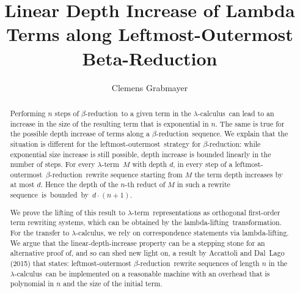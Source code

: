 \documentclass[
submission
]{dmtcs-episciences-tampered}
\author{Clemens Grabmayer\affiliationmark{1}}
\title{{Linear Depth Increase of Lambda Terms
        along Leftmost-Outermost Beta-Reduction}}
\affiliation{
Gran Sasso Science Institute, Viale F. Crispi, 7, 67100 L'Aquila AQ, Italy}
\newcommand{\nb}{\nobreakdash}
\newcommand{\alter}{M}
\newcommand{\lambdacalculus}{$\lambda$\nb-cal\-cu\-lus}
\newcommand{\lambdaterm}{$\lambda$\nb-term}
\newcommand{\lambdalifting}{lambda-lif\-ting}
\newcommand{\betareduction}{$\beta$\nb-re\-duc\-tion}
\newcommand{\lo}{left\-most-outer\-most}
\theoremstyle{plain}
\theoremstyle{definition}
\begin{document}
\maketitle
\begin{abstract}
  Performing $n$ steps of \betareduction\ to a given term in the \lambdacalculus\ 
  can lead to an increase in the size of the resulting term that is exponential in $n$. 
  The same is true for the possible depth increase of terms along a \betareduction\ sequence. 
  We explain that the situation is different for the \lo\ strategy for \betareduction:
  while exponential size increase is still possible, depth increase is bounded linearly in the number of steps. 
  For every \lambdaterm~$\alter$ with depth $d$, 
  in every step of a \lo\ \betareduction\ rewrite sequence starting from $\alter$ 
  the term depth increases by at most $d$.
  Hence the depth of the $n$\nb-th reduct of $\alter$ in such a rewrite sequence~is~bounded~by~$d\cdot (n+1)$.
  
  We prove the lifting of this result to \lambdaterm\ representations as orthogonal first-order term rewriting systems,
  which can be obtained by the \lambdalifting\ transformation.
  For the transfer to \lambdacalculus, we rely on correspondence statements via \lambdalifting. 
  We argue that the linear-depth-increase property can be a stepping stone for an alternative proof of, and so can shed new light on,
  a result by Accattoli and Dal~Lago (2015) that states: 
  leftmost-outermost \betareduction\ rewrite sequences of length $n$ in the \lambdacalculus\ can be implemented on a reasonable machine with an overhead
  that is polynomial in $n$ and the size of the initial term. 
  
\end{abstract}
\end{document}
